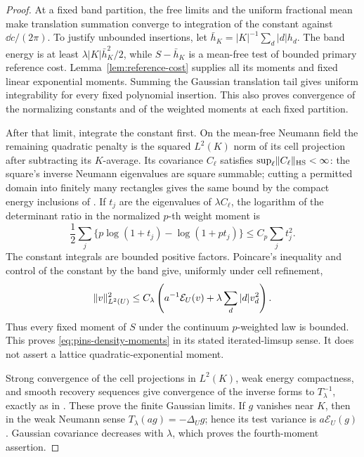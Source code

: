 \begin{proof}
At a fixed band partition, the free limits and the uniform
fractional mean make translation summation converge to integration
of the constant against \(\dd c/(2\pi)\). To justify unbounded
insertions, let \(\bar h_K=|K|^{-1}\sum_d|d|h_d\).
The band energy is at least \(\lambda|K|\bar h_K^2/2\), while
\(S-\bar h_K\) is a mean-free test of bounded primary reference
cost. Lemma~\ref{lem:reference-cost} supplies all its moments
and fixed linear exponential moments. Summing the Gaussian
translation tail gives uniform integrability for every fixed
polynomial insertion. This also proves convergence of the
normalizing constants and of the weighted moments at each fixed
partition.

After that limit, integrate the constant first. On the mean-free
Neumann field the remaining quadratic penalty is the squared
\(L^2(K)\) norm of its cell projection after subtracting its
\(K\)-average. Its covariance \(C_\ell\) satisfies
\(\sup_\ell\lVert C_\ell\rVert_{\mathrm{HS}}<\infty\):
the square's inverse Neumann eigenvalues are square summable;
cutting a permitted domain into finitely many rectangles gives
the same bound by the compact energy inclusions of
. If \(t_j\) are the eigenvalues of
\(\lambda C_\ell\), the logarithm of the determinant ratio in
the normalized \(p\)-th weight moment is
\[
 \frac12\sum_j\{p\log(1+t_j)-\log(1+pt_j)\}
 \le C_p\sum_jt_j^2.
\]
The constant integrals are bounded positive factors.
Poincare's inequality and control of the constant by the band
give, uniformly under cell refinement,
\[
 \lVert v\rVert_{L^2(U)}^2\le C_\lambda
 \left(a^{-1}\mathcal E_U(v)+\lambda\sum_d|d|v_d^2\right).
\]
Thus every fixed moment of \(S\) under the continuum
\(p\)-weighted law is bounded. This proves
\eqref{eq:pins-density-moments} in its stated iterated-limsup
sense. It does not assert a lattice quadratic-exponential
moment.

Strong convergence of the cell projections in \(L^2(K)\),
weak energy compactness, and smooth recovery sequences give
convergence of the inverse forms to \(T_\lambda^{-1}\), exactly
as in . These prove the finite Gaussian
limits. If \(g\) vanishes near \(K\), then in the weak Neumann
sense \(T_\lambda(ag)=-\Delta_Ug\); hence its test variance is
\(a\mathcal E_U(g)\). Gaussian covariance decreases with
\(\lambda\), which proves the fourth-moment assertion.
\end{proof}


